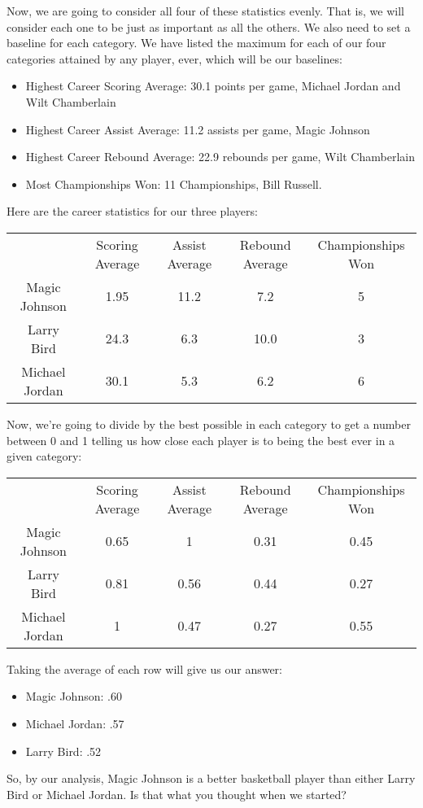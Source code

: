 Now, we are going to consider all four of these statistics evenly. That is, we will consider each one to be just as important as all the others. We also need to set a baseline for each category. We have listed the maximum for each of our four categories attained by any player, ever, which will be our baselines:
\begin{itemize}
\item Highest Career Scoring Average: 30.1 points per game, Michael Jordan and Wilt Chamberlain
\item Highest Career Assist Average: 11.2 assists per game, Magic Johnson
\item Highest Career Rebound Average: 22.9 rebounds per game, Wilt Chamberlain
\item Most Championships Won: 11 Championships, Bill Russell.
\end{itemize}
Here are the career statistics for our three players:
\begin{center}
\begin{tabular}{c|c|c|c|c}
 & Scoring Average & Assist Average & Rebound Average & Championships Won \\
 Magic Johnson & 1.95 & 11.2 & 7.2 & 5 \\
 Larry Bird & 24.3 & 6.3 & 10.0 & 3 \\
 Michael Jordan & 30.1 & 5.3 & 6.2 & 6
\end{tabular}
\end{center}
Now, we're going to divide by the best possible in each category to get a number between 0 and 1 telling us how close each player is to being the best ever in a given category:
\begin{center}
\begin{tabular}{c|c|c|c|c}
 & Scoring Average & Assist Average & Rebound Average & Championships Won \\
 Magic Johnson & 0.65 & 1 & 0.31 & 0.45 \\
 Larry Bird & 0.81 & 0.56 & 0.44 & 0.27 \\
 Michael Jordan & 1 & 0.47 & 0.27 & 0.55
\end{tabular}
\end{center}
Taking the average of each row will give us our answer:
\begin{itemize}
\item Magic Johnson: .60
\item Michael Jordan: .57
\item Larry Bird: .52
\end{itemize}
So, by our analysis, Magic Johnson is a better basketball player than either Larry Bird or Michael Jordan. Is that what you thought when we started? \\






















